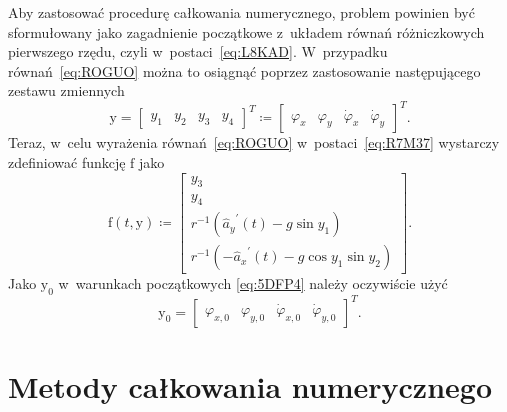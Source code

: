 \documentclass[paper=a4,DIV=12]{tmmlab}
\newcommand{\brm}[1]{\bm{\mathrm{#1}}}
\begin{document}
\begin{appendices}
Aby zastosować procedurę całkowania numerycznego, problem powinien być
sformułowany jako zagadnienie początkowe z~układem równań różniczkowych
pierwszego rzędu, czyli w~postaci~\eqref{eq:L8KAD}. W~przypadku
równań~\eqref{eq:ROGUO} można to osiągnąć poprzez zastosowanie następującego
zestawu zmiennych
\begin{equation}
  \brm{y} = \begin{bmatrix}
    y_1 & y_2 & y_3 & y_4
  \end{bmatrix}^T \coloneqq \begin{bmatrix}
    \varphi_x & \varphi_y & \dot{\varphi}_x & \dot{\varphi}_y
  \end{bmatrix}^T.
  \label{eq:U09S6}
\end{equation}
Teraz, w~celu wyrażenia równań~\eqref{eq:ROGUO} w~postaci~\eqref{eq:R7M37}
wystarczy zdefiniować funkcję $\brm{f}$ jako
\begin{equation}
  \brm{f}\left(t,\brm{y}\right) \coloneqq \begin{bmatrix}
    y_3 \\
    y_4 \\
    r^{-1} \left( {\hat{a}_y}^{\prime}\left(t\right) - g \sin{y_1} \right)  \\
    r^{-1} \left(-{\hat{a}_x}^{\prime}\left(t\right) - g \cos{y_1}\sin{y_2} \right)
  \end{bmatrix}.
  \label{eq:S8LTL}
\end{equation}
Jako $\brm{y}_0$ w~warunkach początkowych \eqref{eq:5DFP4} należy oczywiście
użyć
\begin{equation}
  \brm{y}_0 = \begin{bmatrix}
    \varphi_{x,0} & \varphi_{y,0} & \dot{\varphi}_{x,0} & \dot{\varphi}_{y,0}
  \end{bmatrix}^T.
\end{equation}

\section{Metody całkowania numerycznego}
\label{sec:VNLHT}


\end{appendices}
\end{document}
